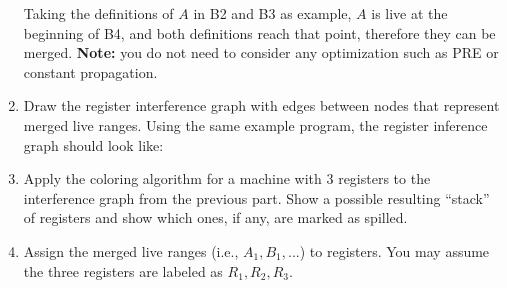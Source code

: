 \begin{problem}
\begin{enumerate}
\begin{center}
        \end{center}
        Taking the definitions of $A$ in B2 and B3 as example, $A$ is live at the beginning of B4, and both definitions reach that point, therefore they can be merged. \textbf{Note:} you do not need to consider any optimization such as PRE or constant propagation.
        \item Draw the register interference graph with edges between nodes that represent merged live ranges. Using the same example program, the register inference graph should look like:
         \begin{center}
        \end{center}
        \item Apply the coloring algorithm for a machine with 3 registers to the interference graph from the previous part. Show a possible resulting ``stack'' of registers and show which ones, if any, are marked as spilled.
        \item Assign the merged live ranges (i.e., $A_1, B_1, ...$) to registers. You may assume the three registers are labeled as $R_1, R_2, R_3$.
    \end{enumerate}

    \newpage
\end{problem}

